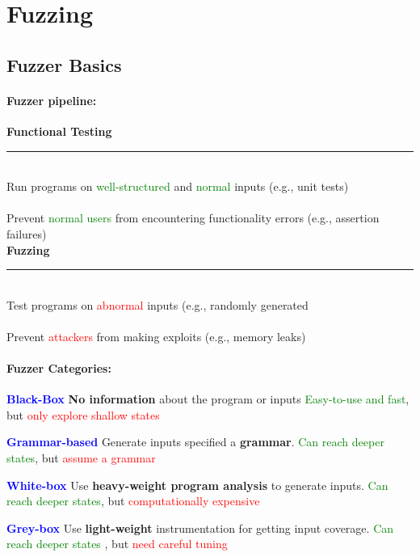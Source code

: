 \section{Fuzzing}
\subsection{Fuzzer Basics}
\paragraph{Fuzzer pipeline:\newline}
\begin{minipage}{0.75\linewidth}
    \centering      
    \def\svgwidth{\linewidth}
        
\end{minipage}

\begin{multicols}{2}
 \textbf{Functional Testing}  \\ \rule{\linewidth}{0.4pt} \\ Run programs on \textcolor{green}{well-structured} and \textcolor{green}{normal} inputs (e.g., unit tests) \\ \\ Prevent \textcolor{green}{normal users} from encountering functionality errors  (e.g., assertion failures) 
 \columnbreak 
 \\ \textbf{Fuzzing}  \\ \rule{\linewidth}{0.4pt}  \\ Test programs on \textcolor{red}{abnormal} inputs (e.g., randomly generated \\ \\ Prevent \textcolor{red}{attackers} from making exploits (e.g., memory leaks)
 
\end{multicols}


\paragraph{Fuzzer Categories:}
\begin{description}
    \item \textbf{\textcolor{blue}{Black-Box}} \textbf{No information} about the program or inputs \textcolor{green}{Easy-to-use and fast}, but \textcolor{red}{only explore shallow states}
    \item \textbf{\textcolor{blue}{Grammar-based}} Generate inputs specified a \textbf{grammar}. \textcolor{green}{Can reach deeper states}, but \textcolor{red}{assume a grammar}
    \item \textbf{\textcolor{blue}{White-box}} Use \textbf{heavy-weight program analysis} to generate inputs. \textcolor{green}{Can reach deeper states}, but \textcolor{red}{computationally expensive}
    \item \textbf{\textcolor{blue}{Grey-box}} Use \textbf{light-weight} instrumentation for getting input coverage. \textcolor{green}{Can reach deeper states }, but \textcolor{red}{need careful tuning}
\end{description}{}
